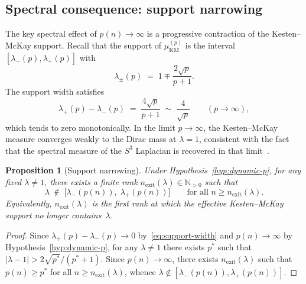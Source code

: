 \documentclass[11pt,a4paper]{article}
\newtheorem{proposition}[theorem]{Proposition}
\newcommand{\nexit}{n_{\mathrm{exit}}}
\begin{document}
    \subsection{Spectral consequence: support narrowing}
      \label{subsec:narrowing}

      The key spectral effect of $p(n)\to\infty$ is a progressive contraction
      of the Kesten--McKay support.
      Recall that the support of $\mu^{(p)}_{\mathrm{KM}}$ is the interval
      $[\lambda_{-}(p),\lambda_{+}(p)]$ with
      \begin{equation}
        \label{eq:support-edges}
        \lambda_{\pm}(p) \;=\; 1 \mp \frac{2\sqrt{p}}{p+1}.
      \end{equation}
      The support width satisfies
      \begin{equation}
        \label{eq:support-width}
        \lambda_{+}(p) - \lambda_{-}(p)
        \;=\; \frac{4\sqrt{p}}{p+1}
        \;\sim\; \frac{4}{\sqrt{p}}
        \qquad (p \to \infty),
      \end{equation}
      which tends to zero monotonically.
      In the limit $p\to\infty$, the Kesten--McKay measure converges weakly to
      the Dirac mass at $\lambda = 1$, consistent with the fact that
      the spectral measure of the $S^3$ Laplacian is recovered in that
      limit~\cite{Beau2026a5}.

      \begin{proposition}[Support narrowing]
        \label{prop:narrowing}
        Under Hypothesis~\ref{hyp:dynamic-p}, for any fixed $\lambda \neq 1$,
        there exists a finite rank $\nexit(\lambda) \in \mathbb{N}_{>0}$ such that
        \begin{equation}
          \label{eq:exit-condition}
          \lambda \;\notin\; \bigl[\lambda_{-}(p(n)),\;\lambda_{+}(p(n))\bigr]
          \qquad \text{for all } n \geq \nexit(\lambda).
        \end{equation}
        Equivalently, $\nexit(\lambda)$ is the first rank at which the effective
        Kesten--McKay support no longer contains~$\lambda$.
      \end{proposition}

      \begin{proof}
        Since $\lambda_{+}(p) - \lambda_{-}(p) \to 0$ by~\eqref{eq:support-width}
        and $p(n)\to\infty$ by Hypothesis~\ref{hyp:dynamic-p},
        for any $\lambda \neq 1$ there exists $p^{*}$ such that
        $|\lambda - 1| > 2\sqrt{p^{*}}/(p^{*}+1)$.
        Since $p(n)\to\infty$, there exists $\nexit(\lambda)$ such that
        $p(n) \geq p^{*}$ for all $n \geq \nexit(\lambda)$,
        whence $\lambda \notin [\lambda_{-}(p(n)),\lambda_{+}(p(n))]$.
      \end{proof}
\end{document}
